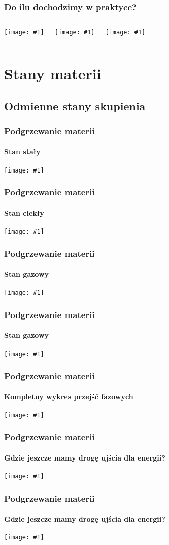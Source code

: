 \documentclass{beamer}
\newcommand {\framedgraphic}[1] {
        \begin{center}
            \texttt{[image: \#1]}
        \end{center}
}
\begin{document}
  \begin{frame}
    \frametitle{Do ilu dochodzimy w praktyce?}
    \begin{columns}[c]
      \framedgraphic{img/wiki_T}
      \pause

      \framedgraphic{img/facebook_like}

      \pause

      \framedgraphic{img/git_logo}
    \end{columns}
  \end{frame}

  \section{Stany materii}
  \subsection{Odmienne stany skupienia}
  \begin{frame}
    \frametitle{Podgrzewanie materii}
    \framesubtitle{Stan stały}
    \framedgraphic{img/solid}
  \end{frame}

  \begin{frame}
    \frametitle{Podgrzewanie materii}
    \framesubtitle{Stan ciekły}
    \framedgraphic{img/liquid}
  \end{frame}


  \begin{frame}
    \frametitle{Podgrzewanie materii}
    \framesubtitle{Stan gazowy}
    \framedgraphic{img/gas}
  \end{frame}

  \begin{frame}
    \frametitle{Podgrzewanie materii}
    \framesubtitle{Stan gazowy}
    \framedgraphic{img/gas2}
  \end{frame}

  \begin{frame}
    \frametitle{Podgrzewanie materii}
    \framesubtitle{Kompletny wykres przejść fazowych}
    \framedgraphic{img/phasetransition}
  \end{frame}

  \begin{frame}
    \frametitle{Podgrzewanie materii}
    \framesubtitle{Gdzie jeszcze mamy drogę ujścia dla energii?}
    \framedgraphic{img/plasma_zoom}
  \end{frame}

  \begin{frame}
    \frametitle{Podgrzewanie materii}
    \framesubtitle{Gdzie jeszcze mamy drogę ujścia dla energii?}
    \framedgraphic{img/plasma_ionise}
  \end{frame}
\end{document}
